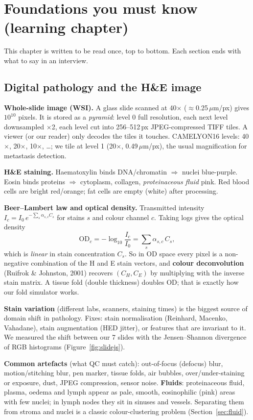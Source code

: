 \chapter{Foundations you must know (learning chapter)}
This chapter is written to be read once, top to bottom. Each section ends with what to say in an interview.

\section{Digital pathology and the H\&E image}
\textbf{Whole-slide image (WSI).} A glass slide scanned at 40$\times$ ($\approx$0.25\,$\mu$m/px) gives $10^{10}$
pixels. It is stored as a \emph{pyramid}: level 0 full resolution, each next level downsampled $\times$2, each level
cut into 256--512\,px JPEG-compressed TIFF tiles. A viewer (or our reader) only decodes the tiles it touches.
CAMELYON16 levels: 40$\times$, 20$\times$, 10$\times$, \ldots; we tile at level 1 (20$\times$, 0.49\,$\mu$m/px), the usual
magnification for metastasis detection.

\textbf{H\&E staining.} Haematoxylin binds DNA/chromatin $\Rightarrow$ nuclei blue-purple. Eosin binds proteins
$\Rightarrow$ cytoplasm, collagen, \emph{proteinaceous fluid} pink. Red blood cells are bright red/orange; fat cells are
empty (white) after processing.

\textbf{Beer--Lambert law and optical density.} Transmitted intensity $I_c=I_{0}\,e^{-\sum_s \alpha_{s,c} C_s}$ for
stains $s$ and colour channel $c$. Taking logs gives the optical density
\[ \mathrm{OD}_c=-\log_{10}\frac{I_c}{I_0}=\sum_s \alpha_{s,c}\,C_s ,\]
which is \emph{linear} in stain concentration $C_s$. So in OD space every pixel is a non-negative combination of the
H and E stain vectors, and \textbf{colour deconvolution} (Ruifrok \& Johnston, 2001) recovers $(C_H, C_E)$ by multiplying
with the inverse stain matrix. A tissue fold (double thickness) doubles OD; that is exactly how our fold simulator works.

\textbf{Stain variation} (different labs, scanners, staining times) is the biggest source of domain shift in
pathology. Fixes: stain normalisation (Reinhard, Macenko, Vahadane), stain augmentation (HED jitter), or features
that are invariant to it. We measured the shift between our 7 slides with the Jensen--Shannon divergence of RGB
histograms (Figure~\ref{fig:slidejs}).

\textbf{Common artefacts} (what QC must catch): out-of-focus (defocus) blur, motion/stitching blur, pen marker,
tissue folds, air bubbles, over/under-staining or exposure, dust, JPEG compression, sensor noise. \textbf{Fluids}:
proteinaceous fluid, plasma, oedema and lymph appear as pale, smooth, eosinophilic (pink) areas with few nuclei;
in lymph nodes they sit in sinuses and vessels. Separating them from stroma and nuclei is a classic colour-clustering
problem (Section~\ref{sec:fluid}).

